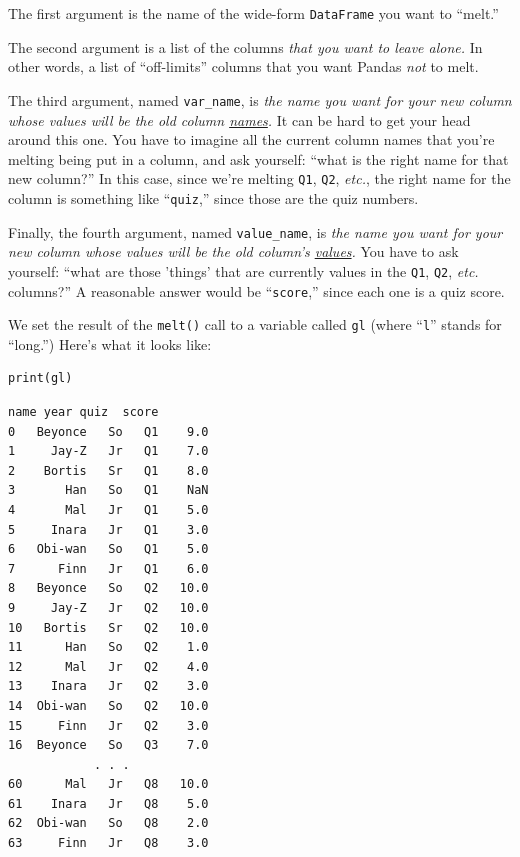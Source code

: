 \begin{compactitem}

\item The first argument is the name of the wide-form \texttt{DataFrame} you
want to ``melt.''

\item The second argument is a list of the columns \textit{that you want to
leave alone.} In other words, a list of ``off-limits'' columns that you want
Pandas \textit{not} to melt.

\item The third argument, named \texttt{var\_name}, is \textit{the name you
want for your new column whose values will be the old column
\underline{names}.} It can be hard to get your head around this one. You have
to imagine all the current column names that you're melting being put in a
column, and ask yourself: ``what is the right name for that new column?'' In
this case, since we're melting \texttt{Q1}, \texttt{Q2}, \textit{etc.}, the
right name for the column is something like ``\texttt{quiz},'' since those are
the quiz numbers.

\item Finally, the fourth argument, named \texttt{value\_name}, is \textit{the
name you want for your new column whose values will be the old column's
\underline{values}.} You have to ask yourself: ``what are those 'things' that
are currently values in the \texttt{Q1}, \texttt{Q2}, \textit{etc.} columns?''
A reasonable answer would be ``\texttt{score},'' since each one is a quiz
score.

\end{compactitem}

We set the result of the \texttt{melt()} call to a variable called \texttt{gl}
(where ``\texttt{l}'' stands for ``long.'') Here's what it looks like:

\begin{Verbatim}[fontsize=\footnotesize,samepage=true,frame=single,framesep=3mm]
print(gl)
\end{Verbatim}
\vspace{-.2in}

\begin{Verbatim}[fontsize=\footnotesize,samepage=true,frame=leftline,framesep=5mm,framerule=1mm,xleftmargin=2cm]
       name year quiz  score
0   Beyonce   So   Q1    9.0
1     Jay-Z   Jr   Q1    7.0
2    Bortis   Sr   Q1    8.0
3       Han   So   Q1    NaN
4       Mal   Jr   Q1    5.0
5     Inara   Jr   Q1    3.0
6   Obi-wan   So   Q1    5.0
7      Finn   Jr   Q1    6.0
8   Beyonce   So   Q2   10.0
9     Jay-Z   Jr   Q2   10.0
10   Bortis   Sr   Q2   10.0
11      Han   So   Q2    1.0
12      Mal   Jr   Q2    4.0
13    Inara   Jr   Q2    3.0
14  Obi-wan   So   Q2   10.0
15     Finn   Jr   Q2    3.0
16  Beyonce   So   Q3    7.0
            . . .
60      Mal   Jr   Q8   10.0
61    Inara   Jr   Q8    5.0
62  Obi-wan   So   Q8    2.0
63     Finn   Jr   Q8    3.0
\end{Verbatim}

